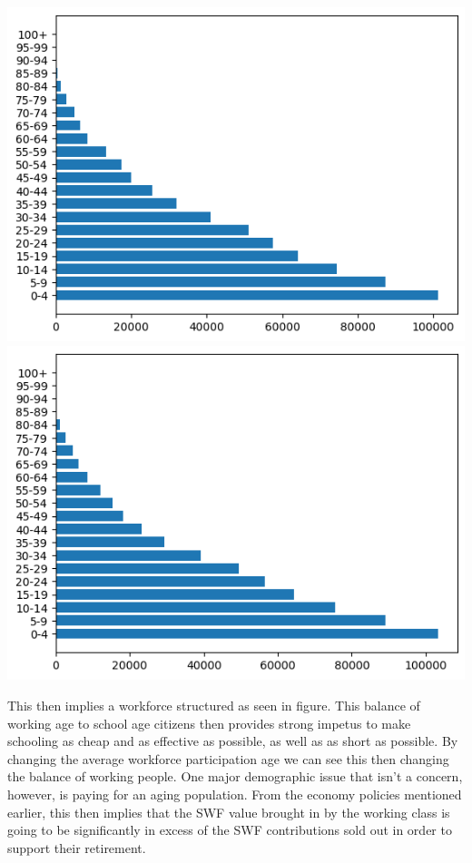 \documentclass[10pt]{article}
\begin{document}
\includegraphics{fig_demopyr_f.png}
\includegraphics{fig_demopyr_m.png}

This then implies a workforce structured as seen in figure. This balance of working age to school age citizens then provides strong impetus to make schooling as cheap and as effective as possible, as well as as short as possible. By changing the average workforce participation age we can see this then changing the balance of working people. One major demographic issue that isn't a concern, however, is paying for an aging population. From the economy policies mentioned earlier, this then implies that the SWF value brought in by the working class is going to be significantly in excess of the SWF contributions sold out in order to support their retirement.
\end{document}

